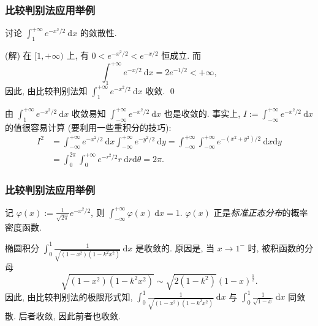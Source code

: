 
\begin{frame}
\frametitle{比较判别法应用举例}

\begin{eg}
讨论 $\displaystyle \int_1^{+\infty} e^{-x^2/2} ~ \mathrm{d} x$ 的敛散性.
\end{eg}

\pause
\vspace{0.5em}

\startproof[bg=yellow, fg=red](解)
在 $[1, +\infty)$ 上, 有 $0 < e^{-x^2/2} < e^{-x/2}$ 恒成立. 而
\[
\int_1^{+\infty} e^{-x/2} ~ \mathrm{d} x = 2e^{-1/2} < +\infty,
\]
因此, 由比较判别法知 $\displaystyle \int_1^{+\infty} e^{-x^2/2} ~ \mathrm{d} x$ 收敛.
\qed

\pause
\vspace{0.5em}

由 $\displaystyle \int_1^{+\infty} e^{-x^2/2} ~ \mathrm{d} x$ 收敛易知 $\displaystyle \int_{-\infty}^{+\infty} e^{-x^2/2} ~ \mathrm{d} x$ 也是收敛的. 事实上, $\displaystyle I := \int_{-\infty}^{+\infty} e^{-x^2/2} ~ \mathrm{d} x$ 的值很容易计算 (要利用一些重积分的技巧):
\begin{align*}
I^2 & = \int_{-\infty}^{+\infty} e^{-x^2/2} ~ \mathrm{d} x \int_{-\infty}^{+\infty} e^{-y^2/2} ~ \mathrm{d} y = \int_{-\infty}^{+\infty} \int_{-\infty}^{+\infty} e^{-(x^2 + y^2)/2} ~ \mathrm{d} x \mathrm{d} y \\
& = \int_0^{2\pi} \int_0^{+\infty} e^{-r^2/2} r ~ \mathrm{d} r \mathrm{d} \theta = 2\pi.
\end{align*}

\end{frame}


\begin{frame}
\frametitle{比较判别法应用举例}

记 $\varphi(x) := \frac{1}{\sqrt{2\pi}} e^{-x^2/2}$, 则 $\displaystyle \int_{-\infty}^{+\infty} \varphi(x) ~ \mathrm{d} x = 1.$ $\varphi(x)$ 正是\emph{标准正态分布}的概率密度函数.

\pause
\vspace{0.5em}

\begin{eg}
椭圆积分 $\displaystyle \int_0^1 \frac{1}{\sqrt{(1-x^2)(1-k^2 x^2)}} ~ \mathrm{d} x$ 是收敛的. 原因是, 当 $x \to 1^-$ 时, 被积函数的分母
\[
\sqrt{(1-x^2)(1-k^2 x^2)} \sim \sqrt{2(1-k^2)} (1 - x)^{\frac{1}{2}}.
\]
因此, 由比较判别法的极限形式知, $\displaystyle \int_0^1 \frac{1}{\sqrt{(1-x^2)(1-k^2 x^2)}} ~ \mathrm{d} x$ 与 $\displaystyle \int_0^1 \frac{1}{\sqrt{1 - x}} ~ \mathrm{d} x$ 同敛散. 后者收敛, 因此前者也收敛.
\end{eg}

\end{frame}

